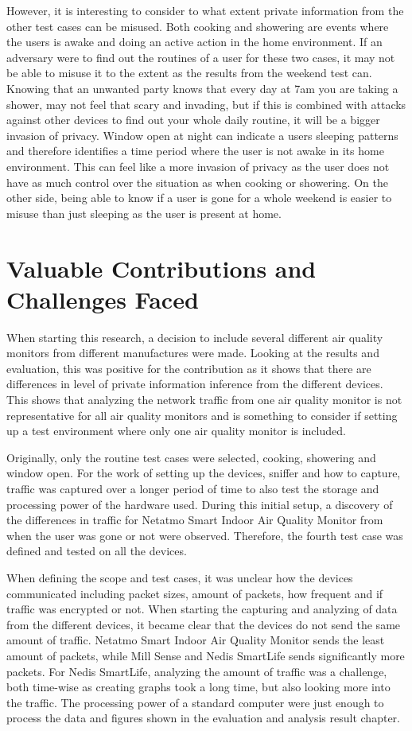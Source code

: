 However, it is interesting to consider to what extent private information from the other test cases can be misused. Both cooking and showering are events where the users is awake and doing an active action in the home environment. If an adversary were to find out the routines of a user for these two cases, it may not be able to misuse it to the extent as the results from the weekend test can. Knowing that an unwanted party knows that every day at 7am you are taking a shower, may not feel that scary and invading, but if this is combined with attacks against other devices to find out your whole daily routine, it will be a bigger invasion of privacy. Window open at night can indicate a users sleeping patterns and therefore identifies a time period where the user is not awake in its home environment. This can feel like a more invasion of privacy as the user does not have as much control over the situation as when cooking or showering. On the other side, being able to know if a user is gone for a whole weekend is easier to misuse than just sleeping as the user is present at home.   

\section{Valuable Contributions and Challenges Faced}
When starting this research, a decision to include several different air quality monitors from different manufactures were made. Looking at the results and evaluation, this was positive for the contribution as it shows that there are differences in level of private information inference from the different devices. This shows that analyzing the network traffic from one air quality monitor is not representative for all air quality monitors and is something to consider if setting up a test environment where only one air quality monitor is included.

Originally, only the routine test cases were selected, cooking, showering and window open. For the work of setting up the devices, sniffer and how to capture, traffic was captured over a longer period of time to also test the storage and processing power of the hardware used. During this initial setup, a discovery of the differences in traffic for Netatmo Smart Indoor Air Quality Monitor from when the user was gone or not were observed. Therefore, the fourth test case was defined and tested on all the devices. 

When defining the scope and test cases, it was unclear how the devices communicated including packet sizes, amount of packets, how frequent and if traffic was encrypted or not. When starting the capturing and analyzing of data from the different devices, it became clear that the devices do not send the same amount of traffic. Netatmo Smart Indoor Air Quality Monitor sends the least amount of packets, while Mill Sense and Nedis SmartLife sends significantly more packets. For Nedis SmartLife, analyzing the amount of traffic was a challenge, both time-wise as creating graphs took a long time, but also looking more into the traffic. The processing power of a standard computer were just enough to process the data and figures shown in the evaluation and analysis result chapter. 

